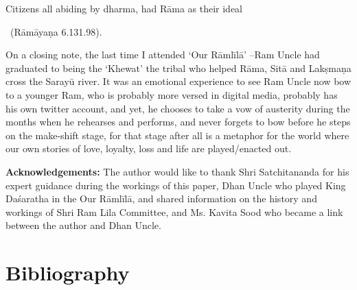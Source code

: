 \begin{myquote}
Citizens all abiding by dharma, had Rāma as their ideal 

~\hfill (Rāmāyaṇa 6.131.98).
\end{myquote}

On a closing note, the last time I attended ‘Our Rāmlīlā’ –Ram Uncle had graduated to being the ‘Khewat’ the tribal who helped Rāma, Sitā and Lakṣmaṇa cross the Sarayū river. It was an emotional experience to see Ram Uncle now bow to a younger Ram, who is probably more versed in digital media, probably has his own twitter account, and yet, he chooses to take a vow of austerity during the months when he rehearses and performs, and never forgets to bow before he steps on the make-shift stage, for that stage after all is a metaphor for the world where our own stories of love, loyalty, loss and life are played/enacted out.

\textbf{Acknowledgements:} The author would like to thank Shri Satchita\-nanda for his expert guidance during the workings of this paper, Dhan Uncle who played King Daśaratha in the Our Rāmlīlā, and shared information on the history and workings of Shri Ram Lila Committee, and Ms. Kavita Sood who became a link between the author and Dhan Uncle.


\section*{Bibliography}

